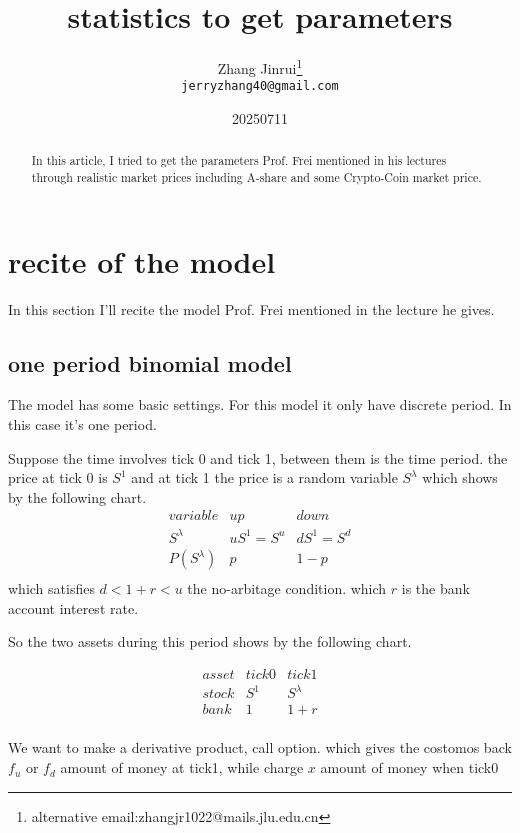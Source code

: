 \documentclass{article}
\title{statistics to get parameters}
\author{Zhang Jinrui\thanks{alternative email:zhangjr1022@mails.jlu.edu.cn} \\ \texttt{jerryzhang40@gmail.com}}
\date{20250711}  %
\theoremstyle{definition} %
\begin{document}
\maketitle

\begin{abstract}
    In this article, I tried to get the parameters
    Prof. Frei mentioned in his lectures through
    realistic market prices including A-share and
    some Crypto-Coin market price.
\end{abstract}

\section{recite of the model}
In this section I'll recite the model
Prof. Frei mentioned in the lecture he
gives.

\subsection{one period binomial model}
The model has some basic settings.
For this model it only have discrete
period. In this case it's one period.

Suppose the time involves tick 0 and tick 1,
between them is the time period.
the price at tick 0 is $S^1$
and at tick 1 the price is a random variable
$S^\lambda$ which shows by the following chart.
$$
    \begin{array}{c|ccc}
        variable     & up       & down     \\
        S^\lambda    & uS^1=S^u & dS^1=S^d \\
        \hline
        P(S^\lambda) & p        & 1-p      \\
    \end{array}
$$
which satisfies $d<1+r<u$ the no-arbitage condition.
which $r$ is the bank account interest rate.

So the two assets during this period shows by
the following chart.

$$
    \begin{array}{c|ccc}
        asset & tick0 & tick1     \\
        stock & S^1   & S^\lambda \\
        \hline
        bank  & 1     & 1+r       \\
    \end{array}
$$

We want to make a derivative product,
call option.
which gives the costomos back $f_u$
or $f_d$ amount of money at tick1, while charge
$x$ amount of money when tick0
\end{document}
